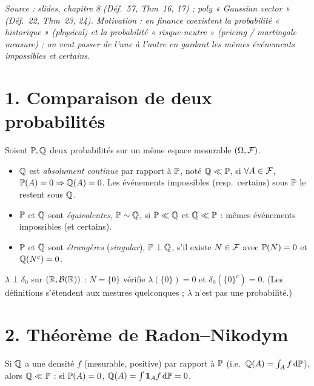 \documentclass[11pt,a4paper]{article}
\begin{document}

\textit{Source : slides, chapitre 8 (Déf.~57, Thm~16, 17) ; poly « Gaussian vector » (Déf.~22, Thm~23, 24).
Motivation : en finance coexistent la probabilité « historique » (\emph{physical}) et la probabilité « risque-neutre »
(\emph{pricing / martingale measure}) ; on veut passer de l'une à l'autre en gardant les mêmes événements impossibles et certains.}

\section*{1. Comparaison de deux probabilités}

\begin{definition}\label{C7:def}
Soient $\mathbb{P},\mathbb{Q}$ deux probabilités sur un même espace mesurable $(\Omega,\mathcal{F})$.
\begin{itemize}
  \item $\mathbb{Q}$ est \emph{absolument continue} par rapport à $\mathbb{P}$, noté $\mathbb{Q}\ll\mathbb{P}$, si
  $\forall A\in\mathcal{F}$, $\mathbb{P}(A)=0\Rightarrow\mathbb{Q}(A)=0$. Les événements impossibles (resp.\ certains) sous $\mathbb{P}$ le restent sous $\mathbb{Q}$.
  \item $\mathbb{P}$ et $\mathbb{Q}$ sont \emph{équivalentes}, $\mathbb{P}\sim\mathbb{Q}$, si $\mathbb{P}\ll\mathbb{Q}$ et $\mathbb{Q}\ll\mathbb{P}$ : mêmes événements impossibles (et certains).
  \item $\mathbb{P}$ et $\mathbb{Q}$ sont \emph{étrangères} (\emph{singular}), $\mathbb{P}\perp\mathbb{Q}$, s'il existe $N\in\mathcal{F}$ avec $\mathbb{P}(N)=0$ et $\mathbb{Q}(N^c)=0$.
\end{itemize}
\end{definition}

\begin{exemple}[slides]
$\lambda\perp\delta_0$ sur $(\mathbb{R},\mathcal{B}(\mathbb{R}))$ : $N=\{0\}$ vérifie $\lambda(\{0\})=0$ et $\delta_0(\{0\}^c)=0$.
(Les définitions s'étendent aux mesures quelconques ; $\lambda$ n'est pas une probabilité.)
\end{exemple}

\section*{2. Théorème de Radon--Nikodym}

\begin{proposition}\label{C7:densite-ac}
Si $\mathbb{Q}$ a une densité $f$ (mesurable, positive) par rapport à $\mathbb{P}$ (i.e.\ $\mathbb{Q}(A)=\int_A f\,\mathrm{d}\mathbb{P}$), alors $\mathbb{Q}\ll\mathbb{P}$ :
si $\mathbb{P}(A)=0$, $\mathbb{Q}(A)=\int\mathbf{1}_Af\,\mathrm{d}\mathbb{P}=0$.
\end{proposition}
\end{document}
